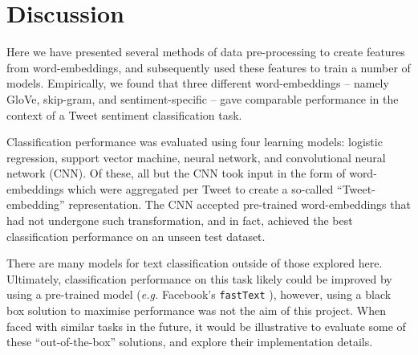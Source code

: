 \section{Discussion}
\label{sec:discussion}

Here we have presented several methods of data pre-processing to create features from word-embeddings, and subsequently used these features to train a number of models. Empirically, we found that three different word-embeddings -- namely GloVe, skip-gram, and sentiment-specific -- gave comparable performance in the context of a Tweet sentiment classification task.

Classification performance was evaluated using four learning models: logistic regression, support vector machine, neural network, and convolutional neural network (CNN). Of these, all but the CNN took input in the form of word-embeddings which were aggregated per Tweet to create a so-called ``Tweet-embedding'' representation. The CNN accepted pre-trained word-embeddings that had not undergone such transformation, and in fact, achieved the best classification performance on an unseen test dataset.

There are many models for text classification outside of those explored here. Ultimately, classification performance on this task likely could be improved by using a pre-trained model (\emph{e.g.} Facebook's \texttt{fastText} \cite{joulin2016bag}), however, using a black box solution to maximise performance was not the aim of this project. When faced with similar tasks in the future, it would be illustrative to evaluate some of these ``out-of-the-box'' solutions, and explore their implementation details.
